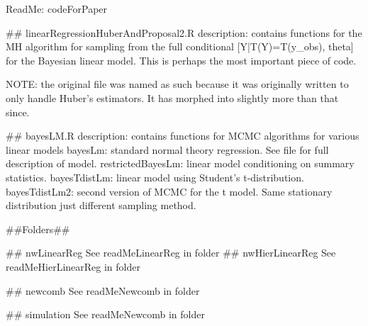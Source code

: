 ReadMe: codeForPaper


##
linearRegressionHuberAndProposal2.R
  description: contains functions for the MH algorithm for sampling from the full conditional [Y|T(Y)=T(y_obs), theta] for the Bayesian linear model. This is perhaps the most important piece of code.
  
NOTE: the original file was named as such because it was originally written to only handle Huber's estimators. It has morphed into slightly more than that since.

##
bayesLM.R
	description: contains functions for MCMC algorithms for various linear models
	bayesLm: standard normal theory regression. See file for full description of model. 
	restrictedBayesLm: linear model conditioning on summary statistics.
	bayesTdistLm: linear model using Student's t-distribution. 
	bayesTdistLm2: second version of MCMC for the t model. Same stationary distribution just different sampling method.

##Folders##
	

##	
nwLinearReg
	See readMeLinearReg in folder
##	
nwHierLinearReg
	See readMeHierLinearReg in folder
	
## 
newcomb
	See readMeNewcomb in folder
  
##
simulation
  See readMeNewcomb in folder